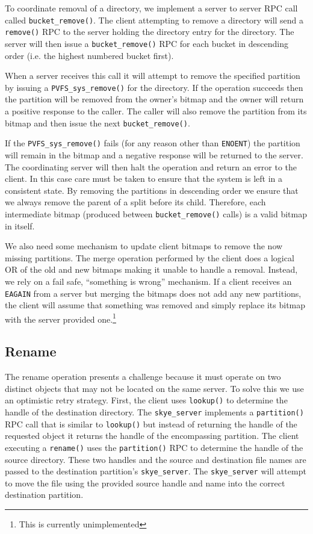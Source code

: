 \documentclass[letterpaper]{article}
\newcommand{\code}[1]{\texttt{#1}}
\begin{document}
To coordinate removal of a directory, we implement a server to server RPC call
called \code{bucket\_\-remove()}.  The client attempting to remove a directory will send a
\code{remove()} RPC to the server holding the directory entry for the directory.  The
server will then issue a \code{bucket\_\-remove()} RPC for each bucket in descending order
(i.e. the highest numbered bucket first).  

When a server receives this call it will attempt to remove the specified
partition by issuing a \code{PVFS\_\-sys\_\-remove()} for the directory.  If the operation
succeeds then the partition will be removed from the owner's bitmap and the
owner will return a positive response to the caller.  The caller will also
remove the partition from its bitmap and then issue the next
\code{bucket\_\-remove()}.

If the \code{PVFS\_\-sys\_\-remove()} fails (for any reason other than \code{ENOENT}) the partition
will remain in the bitmap and a negative response will be returned to the
server.  The coordinating server will then halt the operation and return an
error to the client.  In this case care must be taken to ensure that the system
is left in a consistent state.  By removing the partitions in descending order
we ensure that we always remove the parent of a split before its child.
Therefore, each intermediate bitmap (produced between
\code{bucket\_\-remove()} calls) is
a valid bitmap in itself.

We also need some mechanism to update client bitmaps to remove the now missing
partitions.  The merge operation performed by the client does a logical
OR of the old and new bitmaps making it unable to handle a removal.  Instead, we
rely on a fail safe, ``something is wrong'' mechanism.  If a client receives an
\code{EAGAIN} from a server but merging the bitmaps does not add any new partitions,
the client will assume that something was removed and simply replace its bitmap
with the server provided one.\footnote{This is currently unimplemented}

\subsection{Rename}
The rename operation presents a challenge because it must operate on two distinct
objects that may not be located on the same server.  To solve this we use an
optimistic retry strategy.  First, the client uses \code{lookup()} to determine the
handle of the destination directory.  The \code{skye\_\-server} implements a
\code{partition()}
RPC call that is similar to \code{lookup()} but instead of returning the handle of the
requested object it returns the handle of the encompassing partition.  The
client executing a \code{rename()} uses the \code{partition()} RPC to determine the handle of
the source directory.  These two handles and the source and destination file
names are passed to the destination partition's \code{skye\_\-server}.  The \code{skye\_\-server}
will attempt to move the file using the provided source handle and name into the
correct destination partition.  
\end{document}
